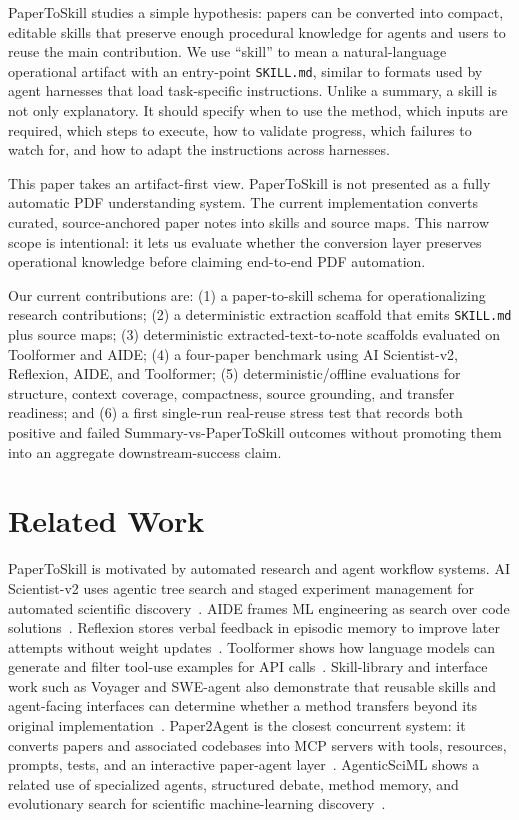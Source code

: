 \documentclass[letterpaper]{article}
\begin{document}
PaperToSkill studies a simple hypothesis: papers can be converted into compact,
editable skills that preserve enough procedural knowledge for agents and users
to reuse the main contribution. We use ``skill'' to mean a natural-language
operational artifact with an entry-point \texttt{SKILL.md}, similar to formats
used by agent harnesses that load task-specific instructions. Unlike a summary,
a skill is not only explanatory. It should specify when to use the method,
which inputs are required, which steps to execute, how to validate progress,
which failures to watch for, and how to adapt the instructions across
harnesses.

This paper takes an artifact-first view. PaperToSkill is not presented as a
fully automatic PDF understanding system. The current implementation converts
curated, source-anchored paper notes into skills and source maps. This narrow
scope is intentional: it lets us evaluate whether the conversion layer
preserves operational knowledge before claiming end-to-end PDF automation.

Our current contributions are: (1) a paper-to-skill schema for operationalizing
research contributions; (2) a deterministic extraction scaffold that emits
\texttt{SKILL.md} plus source maps; (3) deterministic extracted-text-to-note
scaffolds evaluated on Toolformer and AIDE; (4) a four-paper benchmark using AI
Scientist-v2, Reflexion, AIDE, and Toolformer; (5) deterministic/offline
evaluations for structure, context coverage, compactness, source grounding, and
transfer readiness; and (6) a first single-run real-reuse stress test that
records both positive and failed Summary-vs-PaperToSkill outcomes without
promoting them into an aggregate downstream-success claim.

\section{Related Work}

PaperToSkill is motivated by automated research and agent workflow systems.
AI Scientist-v2 uses agentic tree search and staged experiment management for
automated scientific discovery~\cite{lu2025aiscientistv2}. AIDE frames ML
engineering as search over code solutions~\cite{aide2025}. Reflexion stores
verbal feedback in episodic memory to improve later attempts without weight
updates~\cite{shinn2023reflexion}. Toolformer shows how language models can
generate and filter tool-use examples for API calls~\cite{schick2023toolformer}.
Skill-library and interface work such as Voyager and SWE-agent also demonstrate
that reusable skills and agent-facing interfaces can determine whether a method
transfers beyond its original implementation~\cite{wang2023voyager,yang2024sweagent}.
Paper2Agent is the closest concurrent system: it converts papers and associated
codebases into MCP servers with tools, resources, prompts, tests, and an
interactive paper-agent layer~\cite{miao2025paper2agent}. AgenticSciML shows a
related use of specialized agents, structured debate, method memory, and
evolutionary search for scientific machine-learning discovery~\cite{jiang2026agenticsciml}.
\end{document}

